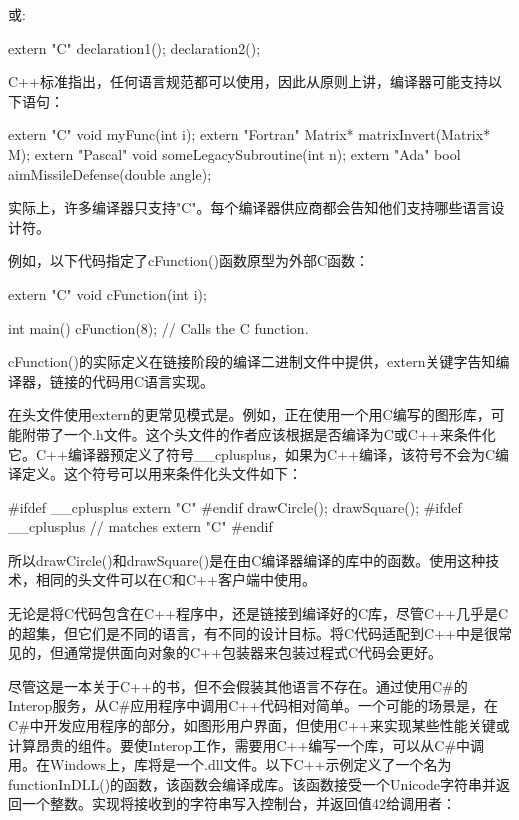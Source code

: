 或:

\begin{cpp}
extern "C" {
    declaration1();
    declaration2();
}
\end{cpp}

C++标准指出，任何语言规范都可以使用，因此从原则上讲，编译器可能支持以下语句：

\begin{cpp}
extern "C" void myFunc(int i);
extern "Fortran" Matrix* matrixInvert(Matrix* M);
extern "Pascal" void someLegacySubroutine(int n);
extern "Ada" bool aimMissileDefense(double angle);
\end{cpp}

实际上，许多编译器只支持"C"。每个编译器供应商都会告知他们支持哪些语言设计符。

例如，以下代码指定了cFunction()函数原型为外部C函数：

\begin{cpp}
extern "C" {
    void cFunction(int i);
}

int main()
{
    cFunction(8); // Calls the C function.
}
\end{cpp}

cFunction()的实际定义在链接阶段的编译二进制文件中提供，extern关键字告知编译器，链接的代码用C语言实现。

在头文件使用extern的更常见模式是。例如，正在使用一个用C编写的图形库，可能附带了一个.h文件。这个头文件的作者应该根据是否编译为C或C++来条件化它。C++编译器预定义了符号\_\_cplusplus，如果为C++编译，该符号不会为C编译定义。这个符号可以用来条件化头文件如下：

\begin{cpp}
#ifdef __cplusplus
    extern "C" {
#endif
        drawCircle();
        drawSquare();
#ifdef __cplusplus
    } // matches extern "C"
#endif
\end{cpp}

所以drawCircle()和drawSquare()是在由C编译器编译的库中的函数。使用这种技术，相同的头文件可以在C和C++客户端中使用。

无论是将C代码包含在C++程序中，还是链接到编译好的C库，尽管C++几乎是C的超集，但它们是不同的语言，有不同的设计目标。将C代码适配到C++中是很常见的，但通常提供面向对象的C++包装器来包装过程式C代码会更好。


尽管这是一本关于C++的书，但不会假装其他语言不存在。通过使用C\#的Interop服务，从C\#应用程序中调用C++代码相对简单。一个可能的场景是，在C\#中开发应用程序的部分，如图形用户界面，但使用C++来实现某些性能关键或计算昂贵的组件。要使Interop工作，需要用C++编写一个库，可以从C\#中调用。在Windows上，库将是一个.dll文件。以下C++示例定义了一个名为functionInDLL()的函数，该函数会编译成库。该函数接受一个Unicode字符串并返回一个整数。实现将接收到的字符串写入控制台，并返回值42给调用者：

